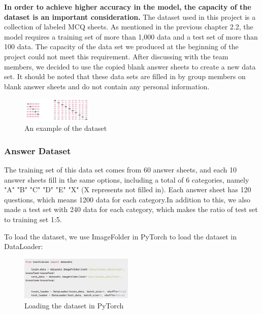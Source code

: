 \documentclass[twocolumn]{article}
\begin{document}
    \textbf{In order to achieve higher accuracy in the model, the capacity of the dataset is an important consideration.} The dataset used in this project is a collection of labeled MCQ sheets. As mentioned in the previous chapter 2.2, the model requires a training set of more than 1,000 data and a test set of more than 100 data. The capacity of the data set we produced at the beginning of the project could not meet this requirement. After discussing with the team members, we decided to use the copied blank answer sheets to create a new data set. It should be noted that these data sets are filled in by group members on blank answer sheets and do not contain any personal information.
    
    \begin{figure}[ht]
        \centering
        \includegraphics[width=0.3\textwidth]{dataset.png}
        \caption{An example of the dataset}
        \label{fig:dataset}
    \end{figure}

        \subsubsection{Answer Dataset}
        The training set of this data set comes from 60 answer sheets, and each 10 answer sheets fill in the same options, including a total of 6 categories, namely "A" "B" "C" "D" "E" "X" (X represents not filled in). Each answer sheet has 120 questions, which means 1200 data for each category.In addition to this, we also made a test set with 240 data for each category, which makes the ratio of test set to training set 1:5.

        To load the dataset, we use ImageFolder in PyTorch to load the dataset in DataLoader:

        \begin{figure}[ht]
            \centering
            \includegraphics[width=0.48\textwidth]{dataloader.png}
            \caption{Loading the dataset in PyTorch}
            \label{fig:data}
        \end{figure}
\end{document}

